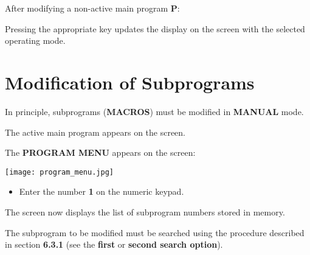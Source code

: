 After modifying a non-active main program \textbf{P}:

\begin{itemize}
\end{itemize}

\vspace{1.5cm}

Pressing the appropriate key updates the display on the screen with the selected operating mode.

\section{Modification of Subprograms}

In principle, subprograms (\textbf{MACROS}) must be modified in \textbf{MANUAL} mode.

\procedure

\begin{itemize}
\end{itemize}
\vspace{.5cm}
\begin{itemize}
\end{itemize}
\vspace{.5cm}
The active main program appears on the screen.

\begin{itemize}
\end{itemize}
\vspace{.5cm}
The \textbf{PROGRAM MENU} appears on the screen:

\begin{center}
    \texttt{[image: program\_menu.jpg]}
\end{center}

\begin{itemize}
    \item Enter the number \textbf{1} on the numeric keypad.
\end{itemize}

The screen now displays the list of subprogram numbers stored in memory.

The subprogram to be modified must be searched using the procedure described in section \textbf{6.3.1} (see the \textbf{first} or \textbf{second search option}).

